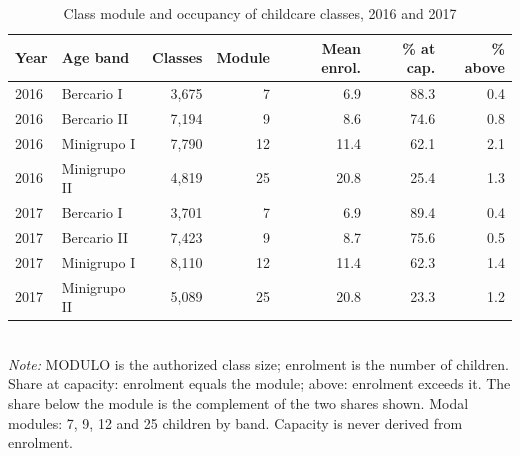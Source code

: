 \begin{table}[htbp]\centering
\caption{Class module and occupancy of childcare classes, 2016 and 2017}
\label{tab:T6a_modulo}
\small
\setlength{\tabcolsep}{4pt}
\begin{tabular}{llrrrrr}
\toprule
Year & Age band & Classes & Module & Mean enrol. & \% at cap. & \% above \\
\midrule
2016 & Bercario I & 3,675 & 7 & 6.9 & 88.3 & 0.4 \\
2016 & Bercario II & 7,194 & 9 & 8.6 & 74.6 & 0.8 \\
2016 & Minigrupo I & 7,790 & 12 & 11.4 & 62.1 & 2.1 \\
2016 & Minigrupo II & 4,819 & 25 & 20.8 & 25.4 & 1.3 \\
2017 & Bercario I & 3,701 & 7 & 6.9 & 89.4 & 0.4 \\
2017 & Bercario II & 7,423 & 9 & 8.7 & 75.6 & 0.5 \\
2017 & Minigrupo I & 8,110 & 12 & 11.4 & 62.3 & 1.4 \\
2017 & Minigrupo II & 5,089 & 25 & 20.8 & 23.3 & 1.2 \\
\bottomrule
\end{tabular}
\\[3pt]{\footnotesize \textit{Note:} MODULO is the authorized class size; enrolment is the number of children. Share at capacity: enrolment equals the module; above: enrolment exceeds it. The share below the module is the complement of the two shares shown. Modal modules: 7, 9, 12 and 25 children by band. Capacity is never derived from enrolment.}
\end{table}
